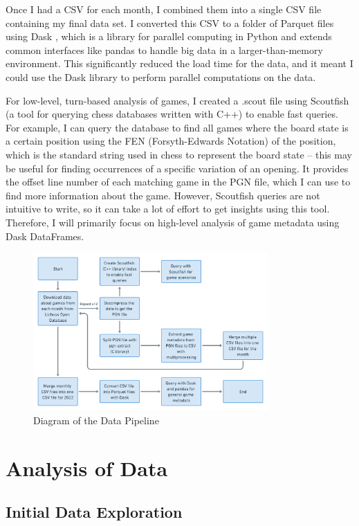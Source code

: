 \documentclass[a4paper, 11pt]{article}
\begin{document}
Once I had a CSV for each month, I combined them into a single CSV file containing my final data set. I converted this CSV to a folder of Parquet files using Dask \cite{dask}, which is a library for parallel computing in Python and extends common interfaces like pandas \cite{pandas} to handle big data in a larger-than-memory environment. This significantly reduced the load time for the data, and it meant I could use the Dask library to perform parallel computations on the data.

For low-level, turn-based analysis of games, I created a .scout file using Scoutfish (a tool for querying chess databases written with C++) \cite{scoutfish} to enable fast queries. For example, I can query the database to find all games where the board state is a certain position using the FEN (Forsyth-Edwards Notation) of the position, which is the standard string used in chess to represent the board state -- this may be useful for finding occurrences of a specific variation of an opening. It provides the offset line number of each matching game in the PGN file, which I can use to find more information about the game. However, Scoutfish queries are not intuitive to write, so it can take a lot of effort to get insights using this tool. Therefore, I will primarily focus on high-level analysis of game metadata using Dask DataFrames.

\begin{figure}[H]
    \centering
    \caption{Diagram of the Data Pipeline}
    \includegraphics[width=0.8\textwidth]{Data Pipeline.png}
\end{figure}

\section{Analysis of Data}

\subsection{Initial Data Exploration}
\end{document}
